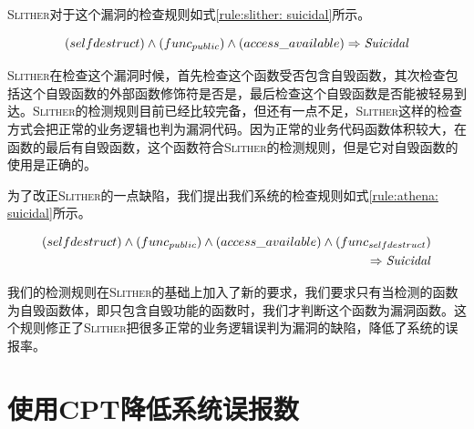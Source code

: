 \textsc{Slither}对于这个漏洞的检查规则如式\ref{rule:slither: suicidal}所示。
\begin{mdframed}[
	linewidth = 1pt,
	innertopmargin = -5pt,
	innerbottommargin = 3pt,
	outerlinewidth = 1pt
	]
    \small
	\begin{equation} \label{rule:slither: suicidal}
    (selfdestruct) \wedge (func_{public}) \wedge (access\_available) \Rightarrow \text{\emph{Suicidal}}
	\end{equation}
\end{mdframed}
\textsc{Slither}在检查这个漏洞时候，首先检查这个函数受否包含自毁函数，其次检查包括这个自毁函数的外部函数修饰符是否是，最后检查这个自毁函数是否能被轻易到达。\textsc{Slither}的检测规则目前已经比较完备，但还有一点不足，\textsc{Slither}这样的检查方式会把正常的业务逻辑也判为漏洞代码。因为正常的业务代码函数体积较大，在函数的最后有自毁函数，这个函数符合\textsc{Slither}的检测规则，但是它对自毁函数的使用是正确的。

为了改正\textsc{Slither}的一点缺陷，我们提出我们系统的检查规则如式\ref{rule:athena: suicidal}所示。
\begin{mdframed}[
	linewidth = 1pt,
	innertopmargin = -10pt,
	innerbottommargin = 3pt,
	outerlinewidth = 1pt
	]
    \small
	\begin{equation} \label{rule:athena: suicidal}
    \begin{split}
       (selfdestruct) \wedge (func_{public}) \wedge (access\_available) \wedge (func_{selfdestruct}) \\
       \Rightarrow \text{\emph{Suicidal}}
    \end{split}
	\end{equation}
\end{mdframed}
我们的检测规则在\textsc{Slither}的基础上加入了新的要求，我们要求只有当检测的函数为自毁函数体，即只包含自毁功能的函数时，我们才判断这个函数为漏洞函数。这个规则修正了\textsc{Slither}把很多正常的业务逻辑误判为漏洞的缺陷，降低了系统的误报率。

\section{使用CPT降低系统误报数}\label{sec:ss}

